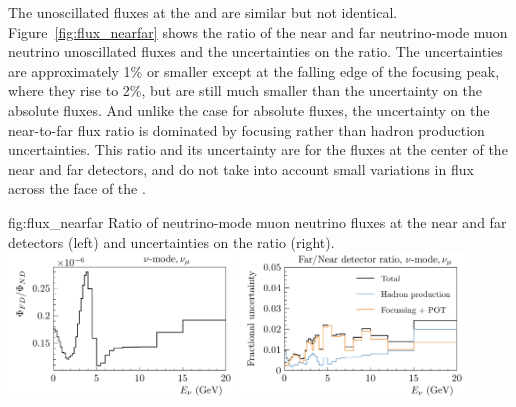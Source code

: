The unoscillated fluxes at the  and  are similar but not identical. Figure~\ref{fig:flux_nearfar} shows the ratio of the near and far neutrino-mode muon neutrino unoscillated fluxes %
and the uncertainties on the ratio.  The uncertainties are approximately 1\% or smaller except at the falling edge of the focusing peak, where they rise to 2\%, but are still much smaller than the uncertainty on the absolute fluxes.    And unlike the case for absolute fluxes, the uncertainty on the near-to-far flux ratio is dominated by focusing rather than hadron production uncertainties.  This ratio and its uncertainty are for the fluxes at the center of the near and far detectors,
and do not take into account small variations in flux across the face of the .     

\begin{dunefigure}{fig:flux_nearfar}
{Ratio of neutrino-mode muon neutrino fluxes at the near and far detectors (left) and uncertainties on the ratio (right). }
    \includegraphics[width=0.45\textwidth]{graphics/NDFD_ratio_left.pdf}
     \includegraphics[width=0.45\textwidth]{graphics/HP_NonHP_FDND_Ratio_ErrBreakdown_right.pdf}
\end{dunefigure}



